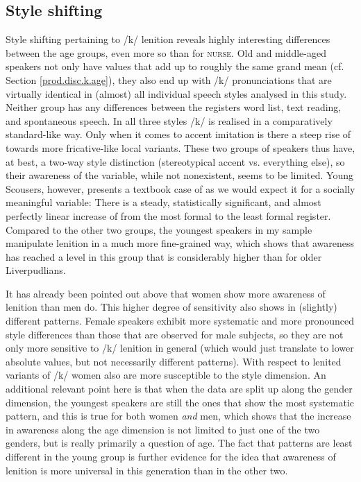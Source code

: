 \subsection{Style shifting}
\label{prod.disc.k.style}

Style shifting pertaining to /k/ lenition reveals highly interesting differences between the age groups, even more so than for \textsc{nurse}.
Old and middle-aged speakers not only have  values that add up to roughly the same grand mean (cf. Section \ref{prod.disc.k.age}), they also end up with /k/ pronunciations that are virtually identical in (almost) all individual speech styles analysed in this study.
Neither group has any differences between the registers word list, text reading, and spontaneous speech.
In all three styles /k/ is realised in a comparatively standard-like way.
Only when it comes to accent imitation is there a steep rise of  towards more fricative-like local variants.
These two groups of speakers thus have, at best, a two-way style distinction (stereotypical accent vs. everything else), so their awareness of the variable, while not nonexistent, seems to be limited.
Young Scousers, however, presents a textbook case of  as we would expect it for a socially meaningful variable: There is a steady, statistically significant, and almost perfectly linear increase of  from the most formal to the least formal register.
Compared to the other two groups, the youngest speakers in my sample manipulate lenition in a much more fine-grained way, which shows that awareness has reached a level in this group that is considerably higher than for older Liverpudlians.

It has already been pointed out above that women show more awareness of lenition than men do.
This higher degree of sensitivity also shows in (slightly) different  patterns.
Female speakers exhibit more systematic and more pronounced style differences than those that are observed for male subjects, so they are not only more sensitive to /k/ lenition in general (which would just translate to lower absolute  values, but not necessarily different  patterns).
With respect to lenited variants of /k/ women also are more susceptible to the style dimension.
An additional relevant point here is that when the data are split up along the gender dimension, the youngest speakers are still the ones that show the most systematic  pattern, and this is true for both women \emph{and} men, which shows that the increase in awareness along the age dimension is not limited to just one of the two genders, but is really primarily a question of age.
The fact that  patterns are least different in the young group is further evidence for the idea that awareness of lenition is more universal in this generation than in the other two.

